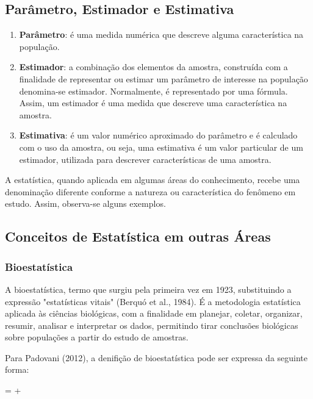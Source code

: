\subsection{Parâmetro, Estimador e Estimativa}

\begin{enumerate}
\item \textbf{Parâmetro}: é uma medida numérica que descreve alguma característica na população.
\item \textbf{Estimador}: a combinação dos elementos da amostra, construída com a finalidade de representar ou estimar um parâmetro de interesse na população denomina-se estimador. Normalmente, é representado por uma fórmula. Assim, um estimador é uma medida que descreve uma característica na amostra.
\item \textbf{Estimativa}: é um valor numérico aproximado do parâmetro e é calculado com o uso da amostra, ou seja, uma estimativa é um valor particular de um estimador, utilizada para descrever características de uma amostra.
\end{enumerate}

A estatística, quando aplicada em algumas áreas do conhecimento, recebe uma denominação diferente conforme a natureza ou
característica do fenômeno em estudo. Assim, observa-se alguns exemplos.

\newpage
\subsection{Conceitos de Estatística em outras Áreas}
\subsubsection{Bioestatística}

A bioestatística, termo que surgiu pela primeira vez em 1923, substituindo a expressão "estatísticas vitais" (Berquó et al., 1984). É a metodologia estatística aplicada às ciências biológicas, com a finalidade em planejar, coletar, organizar, resumir, analisar e interpretar os dados, permitindo tirar conclusões biológicas sobre populações a partir do estudo de amostras.\vskip0.3cm

Para Padovani (2012), a denifição de bioestatística pode ser expressa da seguinte forma:

\begin{center}
 =  + 
\end{center}

